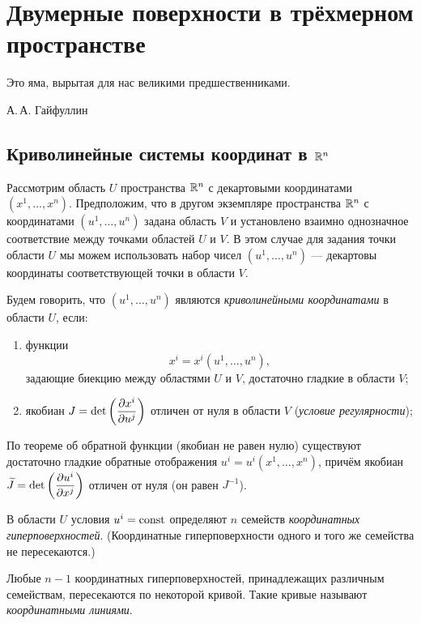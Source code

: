 \section{Двумерные поверхности в трёхмерном пространстве}

\epigraph{Это яма, вырытая для нас великими предшественниками.}{А.\,А. Гайфуллин}

\subsection{Криволинейные системы координат в $\mathbb{R}^n$}

Рассмотрим область $U$ пространства $\mathbb{R}^n$ с декартовыми координатами $(x^1, \ldots, x^n)$. Предположим, что в другом экземпляре пространства $\mathbb{R}^n$ с координатами $(u^1, \ldots, u^n)$ задана область $V$ и установлено взаимно однозначное соответствие между точками областей $U$ и $V$. В этом случае для задания точки области $U$ мы можем использовать набор чисел $(u^1, \ldots, u^n)$ --- декартовы координаты соответствующей точки в области $V$.

\begin{definition}
	Будем говорить, что $(u^1, \ldots, u^n)$ являются \textit{криволинейными координатами} в области $U$, если:
	\begin{enumerate}[nolistsep, label=(\arabic*)]
		\item функции
			\[
				x^i = x^i(u^1, \ldots, u^n),
			\]
			задающие биекцию между областями $U$ и $V$, достаточно гладкие в области $V$;
		\item якобиан $\displaystyle J = \det\left(\frac{\partial x^i}{\partial u^j}\right)$ отличен от нуля в области $V$ (\textit{условие регулярности});
	\end{enumerate}
\end{definition}

По теореме об обратной функции (якобиан не равен нулю) существуют достаточно гладкие обратные отображения $u^i = u^i(x^1, \ldots, x^n)$, причём якобиан $\displaystyle\widetilde{J} = \det\left(\frac{\partial u^i}{\partial x^j}\right)$ отличен от нуля (он равен $J^{-1}$).

В области $U$ условия $u^i = \mathrm{const}$ определяют $n$ семейств \textit{координатных гиперповерхностей}. (Координатные гиперповерхности одного и того же семейства не пересекаются.)

Любые $n - 1$ координатных гиперповерхностей, принадлежащих различным семействам, пересекаются по некоторой кривой. Такие кривые называют \textit{координатными линиями}.

